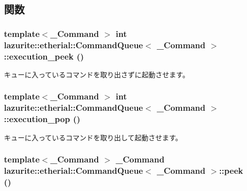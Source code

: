 \subsection{関数}
\hypertarget{classlazurite_1_1etherial_1_1_command_queue_3_01___command_01_4_a71d8c3a5843c744cbc52a0e7728a3524}{
\subsubsection[{execution\_\-peek}]{\setlength{\rightskip}{0pt plus 5cm}template$<$\_\-Command $>$ int lazurite::etherial::CommandQueue$<$ \_\-Command $>$::execution\_\-peek ()}}
\label{classlazurite_1_1etherial_1_1_command_queue_3_01___command_01_4_a71d8c3a5843c744cbc52a0e7728a3524}
キューに入っているコマンドを取り出さずに起動させます。 \hypertarget{classlazurite_1_1etherial_1_1_command_queue_3_01___command_01_4_a92848fc92ee4741d05bcd96f39f23524}{
\subsubsection[{execution\_\-pop}]{\setlength{\rightskip}{0pt plus 5cm}template$<$\_\-Command $>$ int lazurite::etherial::CommandQueue$<$ \_\-Command $>$::execution\_\-pop ()}}
\label{classlazurite_1_1etherial_1_1_command_queue_3_01___command_01_4_a92848fc92ee4741d05bcd96f39f23524}
キューに入っているコマンドを取り出して起動させます。 \hypertarget{classlazurite_1_1etherial_1_1_command_queue_3_01___command_01_4_a931227fc5def14ac815a5474dd3f10b7}{
\subsubsection[{peek}]{\setlength{\rightskip}{0pt plus 5cm}template$<$\_\-Command $>$ \_\-Command lazurite::etherial::CommandQueue$<$ \_\-Command $>$::peek ()}}
